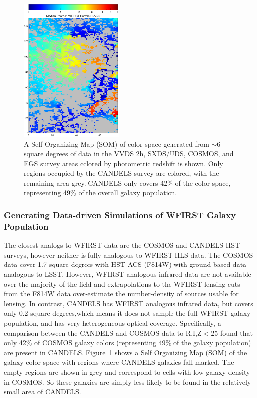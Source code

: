 \begin{figure}
 \includegraphics[width=0.45\textwidth] {./plots/wfirst_color_dist.eps}
\caption{A Self Organizing Map (SOM) \citep{Masters2015} of color space generated from $\sim6$ square degrees of data in the VVDS 2h, SXDS/UDS, COSMOS, and EGS survey areas colored by photometric redshift is shown.  Only regions occupied by the CANDELS survey are colored, with the remaining area grey.  CANDELS only covers 42\% of the color space, representing 49\% of the overall galaxy population.}
\label{fig:EuclidCandelsRep}
\end{figure}

\subsubsection{Generating Data-driven Simulations of WFIRST Galaxy Population}
\label{sec:candels}

The closest analogs to WFIRST data are the COSMOS and CANDELS HST surveys, however neither is fully analogous to
 WFIRST HLS data.  The COSMOS data cover 1.7 square degrees with HST-ACS (F814W)
 with ground based data analogous to LSST.  However, WFIRST analogous infrared
 data are not available over the majority of the field and extrapolations to the
 WFIRST lensing cuts from the F814W data over-estimate the number-density of
 sources usable for lensing.  In contrast, CANDELS has WFIRST analogous infrared
 data, but covers only 0.2 square degrees,which means it does not sample the
 full WFIRST galaxy population, and has very heterogeneous optical coverage.
 Specifically, a comparison between the CANDELS and COSMOS data to R,I,Z$<$25
 found that only 42\% of COSMOS galaxy colors (representing 49\% of the galaxy
 population) are present in CANDELS.  Figure~\ref{fig:EuclidCandelsRep} shows a
 Self Organizing Map (SOM) \citep{Masters2015} of the galaxy color space with
 regions where CANDELS galaxies fall marked.  The empty regions are shown in
 grey and correspond to cells with low galaxy density in COSMOS.  So these
 galaxies are simply less likely to be found in the relatively small area of
 CANDELS.

